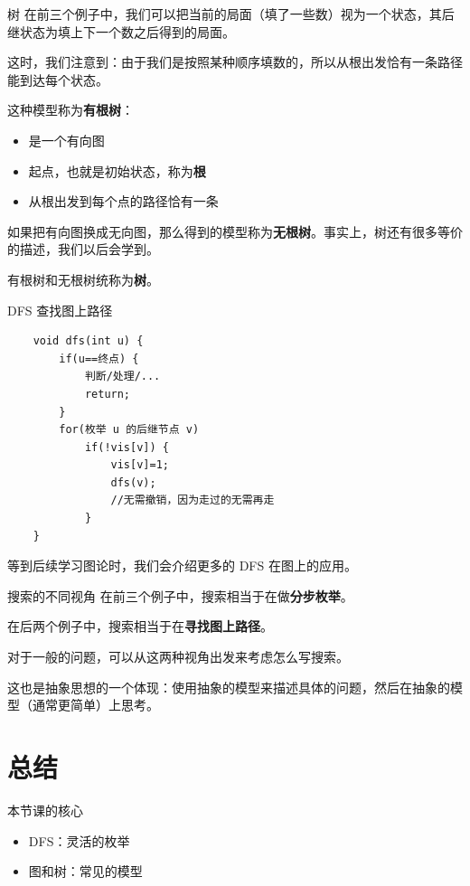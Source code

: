 \documentclass[11pt,aspectratio=169]{beamer}
\begin{document}
\begin{frame}{树}
    在前三个例子中，我们可以把当前的局面（填了一些数）视为一个状态，其后继状态为填上下一个数之后得到的局面。

    这时，我们注意到：由于我们是按照某种顺序填数的，所以从根出发恰有一条路径能到达每个状态。

    这种模型称为\textbf{有根树}：
    \begin{itemize}
        \item 是一个有向图
        \item 起点，也就是初始状态，称为\textbf{根}
        \item 从根出发到每个点的路径恰有一条
    \end{itemize}

    如果把有向图换成无向图，那么得到的模型称为\textbf{无根树}。事实上，树还有很多等价的描述，我们以后会学到。

    有根树和无根树统称为\textbf{树}。
\end{frame}

\begin{frame}[fragile]{DFS 查找图上路径}
    \begin{lstlisting}
    void dfs(int u) {
        if(u==终点) {
            判断/处理/...
            return;
        }
        for(枚举 u 的后继节点 v)
            if(!vis[v]) {
                vis[v]=1;
                dfs(v);
                //无需撤销，因为走过的无需再走
            }
    }
    \end{lstlisting}

    等到后续学习图论时，我们会介绍更多的 DFS 在图上的应用。
\end{frame}

\begin{frame}{搜索的不同视角}
    在前三个例子中，搜索相当于在做\textbf{分步枚举}。
    
    在后两个例子中，搜索相当于在\textbf{寻找图上路径}。
    
    对于一般的问题，可以从这两种视角出发来考虑怎么写搜索。

    这也是抽象思想的一个体现：使用抽象的模型来描述具体的问题，然后在抽象的模型（通常更简单）上思考。
\end{frame}



\section{总结}

\begin{frame}{本节课的核心}
\begin{itemize}
    \item DFS：灵活的枚举
    \item 图和树：常见的模型
\end{itemize}
\end{frame}
\end{document}
